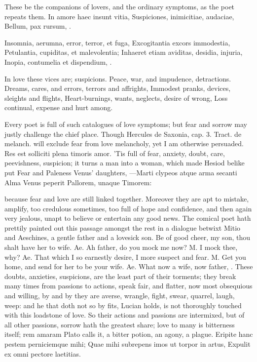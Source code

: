 {These be the companions of lovers, and the ordinary symptoms, as the
poet repeats them.
In amore haec insunt vitia,
Suspiciones, inimicitiae, audaciae,
Bellum, pax rursum, \etc{}.

Insomnia, aerumna, error, terror, et fuga,
Excogitantia excors immodestia,
Petulantia, cupiditas, et malevolentia;
Inhaeret etiam aviditas, desidia, injuria,
Inopia, contumelia et dispendium, \etc{}.

In love these vices are; suspicions.
Peace, war, and impudence, detractions.
Dreams, cares, and errors, terrors and affrights,
Immodest pranks, devices, sleights and flights,
Heart-burnings, wants, neglects, desire of wrong,
Loss continual, expense and hurt among.

Every poet is full of such catalogues of love symptoms; but fear and
sorrow may justly challenge the chief place. Though Hercules de
Saxonia, cap. 3. Tract. de melanch. will exclude fear from love
melancholy, yet I am otherwise persuaded. Res est solliciti plena
timoris amor. 'Tis full of fear, anxiety, doubt, care, peevishness,
suspicion; it turns a man into a woman, which made Hesiod belike put
Fear and Paleness Venus' daughters,
---Marti clypeos atque arma secanti
Alma Venus peperit Pallorem, unaque Timorem:

because fear and love are still linked together. Moreover they are apt
to mistake, amplify, too credulous sometimes, too full of hope and
confidence, and then again very jealous, unapt to believe or entertain
any good news. The comical poet hath prettily painted out this passage
amongst the rest in a dialogue betwixt Mitio and Aeschines, a
gentle father and a lovesick son. Be of good cheer, my son, thou shalt
have her to wife. Ae. Ah father, do you mock me now? M. I mock thee,
why? Ae. That which I so earnestly desire, I more suspect and fear. M.
Get you home, and send for her to be your wife. Ae. What now a wife,
now father, \etc{}. These doubts, anxieties, suspicions, are the least part
of their torments; they break many times from passions to actions,
speak fair, and flatter, now most obsequious and willing, by and by
they are averse, wrangle, fight, swear, quarrel, laugh, weep: and he
that doth not so by fits, Lucian holds, is not thoroughly touched
with this loadstone of love. So their actions and passions are
intermixed, but of all other passions, sorrow hath the greatest share;
love to many is bitterness itself; rem amaram Plato calls it, a
bitter potion, an agony, a plague.
Eripite hanc pestem perniciemque mihi;
Quae mihi subrepens imos ut torpor in artus,
Expulit ex omni pectore laetitias.

}
